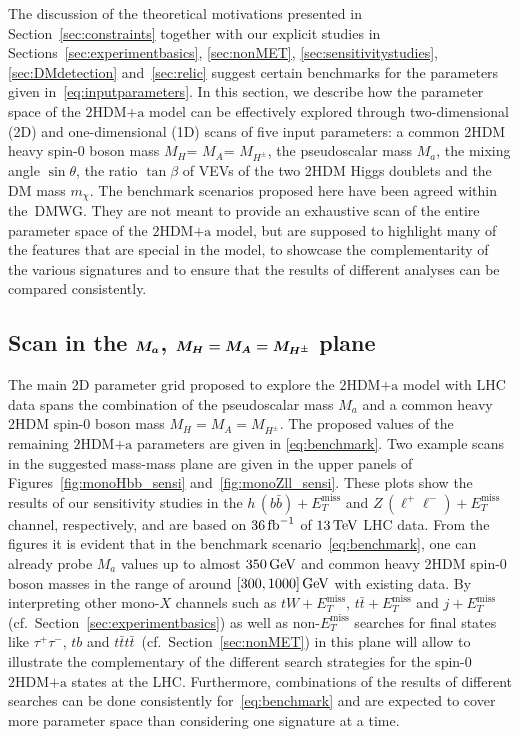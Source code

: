 \documentclass[a4paper, 11pt,notoc]{article}
\newcommand{\MET}{\ensuremath{E_T^\mathrm{miss}}\xspace}
\newcommand{\mA}{\ensuremath{M_{A}}\xspace}
\newcommand{\ma}{\ensuremath{M_{a}}\xspace}
\newcommand{\mH}{\ensuremath{M_{H}}\xspace}
\newcommand{\mHc}{\ensuremath{M_{H^{\pm}}}\xspace}
\newcommand{\hdma}{\ensuremath{\textrm{2HDM+a}}\xspace}
\def\bm#1{\mbox{\boldmath$#1$\unboldmath}}
\begin{document}
The discussion of the theoretical motivations presented in Section~\ref{sec:constraints} together with our explicit studies  in Sections~\ref{sec:experimentbasics}, \ref{sec:nonMET}, \ref{sec:sensitivitystudies},  \ref{sec:DMdetection} and~\ref{sec:relic} suggest certain benchmarks for the parameters given in~\eqref{eq:inputparameters}. In this section, we describe how the parameter space of the \hdma model can be effectively explored through two-dimensional (2D) and one-dimensional (1D) scans of five input parameters: a common 2HDM heavy  {\color{red} spin-0 boson}  mass \mH = \mA = \mHc, the  pseudoscalar mass \ma, the mixing angle $\sin \theta$, the ratio $\tan \beta$  of VEVs of the two 2HDM Higgs doublets  and the DM  mass $m_\chi$. The benchmark scenarios proposed here have been agreed within the~DMWG. {\color{red} They are not meant to provide an exhaustive scan of the entire parameter space of the \hdma model, but are supposed to highlight many of the features that are special in the model, to showcase the complementarity of the various signatures and to ensure that the results of different analyses can be compared consistently.}

\subsection*{Scan in the $\bm{\ma}$,  $\bm{\mH = \mA = \mHc}$ plane}

The main 2D parameter grid proposed to explore the \hdma model with LHC data spans the combination of the pseudoscalar mass $\ma$ and a common heavy 2HDM  {\color{red} spin-0 boson}  mass $\mH = \mA = \mHc$. The proposed values of the remaining \hdma parameters are given in \eqref{eq:benchmark}. Two example scans in the suggested mass-mass plane are given in the upper panels of Figures~\ref{fig:monoHbb_sensi} and~\ref{fig:monoZll_sensi}. These plots show the results of our sensitivity studies in the $h \, (b \bar b) + \MET$ and $Z \, (\ell^+ \ell^-) + \MET$ channel, respectively, and are based on $36 \, {\rm fb}^{-1}$ of $13 \, {\rm TeV}$ LHC data. {\color{red} From the figures it is evident that in the benchmark scenario~\eqref{eq:benchmark}, one can already probe $M_a$ values  up to almost $350 \, {\rm GeV}$ and common heavy 2HDM  {\color{red} spin-0 boson}  masses in the range of around $[300, 1000] \, {\rm GeV}$ with existing data.  By interpreting other mono-$X$ channels such as $t W + \MET$, $t \bar t + \MET$ and $j + \MET$ (cf.~Section~\ref{sec:experimentbasics}) as well as non-$\MET$ searches for final states like $\tau^+ \tau^-$, $tb$ and  $t \bar t t \bar t$~(cf.~Section~\ref{sec:nonMET}) in this plane will allow to  illustrate the complementary of the different search strategies for the spin-0 \hdma states at the LHC.} Furthermore, combinations of the results of different searches can be done consistently for~\eqref{eq:benchmark} and are expected to cover more parameter space than considering one signature at a time. 
\end{document}
